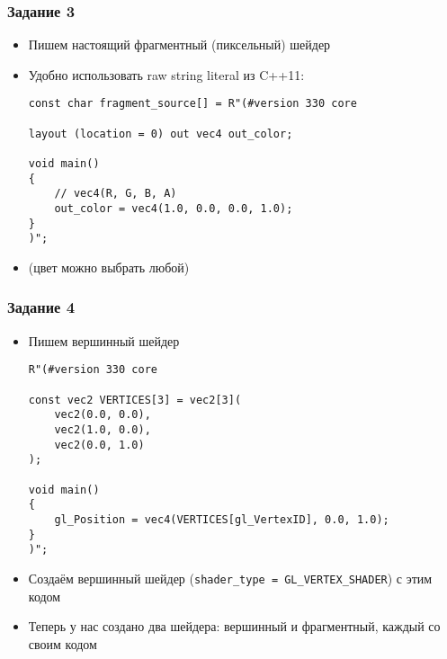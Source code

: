 \documentclass{beamer}
\begin{document}
\begin{frame}[fragile]
\frametitle{Задание 3}
\begin{itemize}
\item Пишем настоящий фрагментный (пиксельный) шейдер
\pause
\item Удобно использовать raw string literal из C++11:
\begin{verbatim}
const char fragment_source[] = R"(#version 330 core

layout (location = 0) out vec4 out_color;

void main()
{
    // vec4(R, G, B, A)
    out_color = vec4(1.0, 0.0, 0.0, 1.0);
}
)";
\end{verbatim}
\pause
\item (цвет можно выбрать любой)
\end{itemize}
\end{frame}

\begin{frame}[fragile]
\frametitle{Задание 4}
\fontsize{8pt}{8pt}\selectfont
\begin{itemize}
\item Пишем вершинный шейдер
\pause
\begin{verbatim}
R"(#version 330 core

const vec2 VERTICES[3] = vec2[3](
    vec2(0.0, 0.0),
    vec2(1.0, 0.0),
    vec2(0.0, 1.0)
);

void main()
{
    gl_Position = vec4(VERTICES[gl_VertexID], 0.0, 1.0);
}
)";
\end{verbatim}
\pause
\item Создаём вершинный шейдер (\verb|shader_type = GL_VERTEX_SHADER|) с этим кодом
\pause
\item Теперь у нас создано два шейдера: вершинный и фрагментный, каждый со своим кодом
\end{itemize}
\end{frame}
\end{document}
